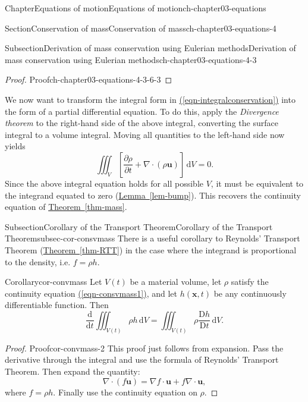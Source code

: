 \documentclass[oneside,10pt,]{book}
\newcommand{\xreffont}{\relax}
\numberwithin{equation}{section}
\newcommand{\de}{\mathrm{d}}
\newcommand{\dd}[2]{\frac{\de#1}{\de#2}}
\newcommand{\DD}[2]{\frac{\mathrm{D}#1}{\mathrm{D}#2}}
\newcommand{\pd}[2]{\frac{\partial#1}{\partial#2}}
\newcommand{\bx}{\boldsymbol{x}}
\newcommand{\bu}{\boldsymbol{u}}
\begin{document}
\begin{chapterptx}{Chapter}{Equations of motion}{}{Equations of motion}{}{}{ch-chapter03-equations}
\begin{sectionptx}{Section}{Conservation of mass}{}{Conservation of mass}{}{}{ch-chapter03-equations-4}
\begin{subsectionptx}{Subsection}{Derivation of mass conservation using Eulerian methods}{}{Derivation of mass conservation using Eulerian methods}{}{}{ch-chapter03-equations-4-3}
\begin{proof}{Proof}{}{ch-chapter03-equations-4-3-6-3}
\end{proof}
We now want to transform the integral form in \hyperref[eqn-integralconservation]{({\xreffont\ref{eqn-integralconservation}})} into the form of a partial differential equation. To do this, apply the \emph{Divergence theorem} to the right-hand side of the above integral, converting the surface integral to a volume integral. Moving all quantities to the left-hand side now yields%
\begin{equation*}
\iiint_V \left[ \pd{\rho}{t} + \nabla \cdot (\rho \bu)\right] \, \de{V} = 0.
\end{equation*}
Since the above integral equation holds for all possible \(V\), it must be equivalent to the integrand equated to zero (\hyperref[lem-bump]{Lemma~{\xreffont\ref{lem-bump}}}). This recovers the continuity equation of \hyperref[thm-mass]{Theorem~{\xreffont\ref{thm-mass}}}.%
\end{subsectionptx}
%
%
\typeout{************************************************}
\typeout{************************************************}
%
\begin{subsectionptx}{Subsection}{Corollary of the Transport Theorem}{}{Corollary of the Transport Theorem}{}{}{subsec-cor-consvmass}
There is a useful corollary to Reynolds' Transport Theorem (\hyperref[thm-RTT]{Theorem~{\xreffont\ref{thm-RTT}}}) in the case where the integrand is proportional to the density, i.e. \(f = \rho h\).%
\begin{corollary}{Corollary}{}{}{cor-convmass}%
Let \(V(t)\) be a material volume, let \(\rho\) satisfy the continuity equation \hyperref[eqn-consvmass1]{({\xreffont\ref{eqn-consvmass1}})}, and let \(h(\bx, t)\) be any continuously differentiable function. Then%
\begin{equation}
\dd{}{t} \iiint_{V(t)} \rho h \, \de{V} = \iiint_{V(t)} \rho \DD{h}{t} \, \de{V}.\label{eqn-cor-convmass}
\end{equation}
%
\end{corollary}
\begin{proof}{Proof}{}{cor-convmass-2}
This proof just follows from expansion. Pass the derivative through the integral and use the formula of Reynolds' Transport Theorem. Then expand the quantity:%
\begin{equation*}
\nabla \cdot (f\bu) = \nabla f \cdot \bu + f \nabla \cdot \bu,
\end{equation*}
where \(f = \rho h\). Finally use the continuity equation on \(\rho\).%
\end{proof}

\end{subsectionptx}
\end{sectionptx}
\end{chapterptx}
\end{document}
